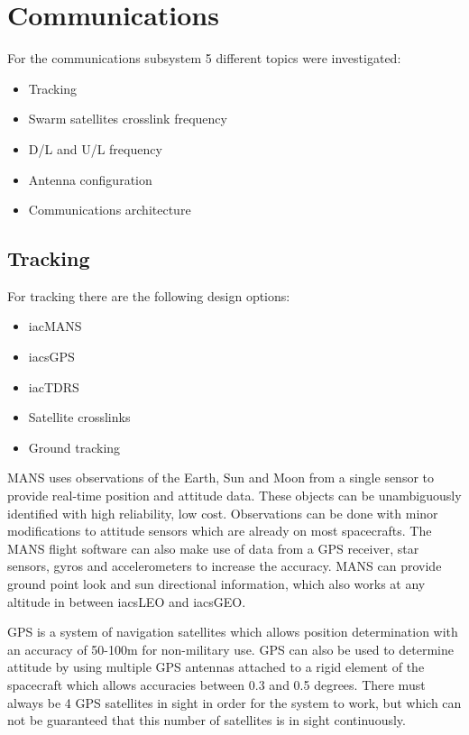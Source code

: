 \section{Communications}
\label{blDOCOM}

For the communications subsystem 5 different topics were investigated:
\begin{itemize}
\item Tracking
\item Swarm satellites crosslink frequency
\item D/L and U/L frequency
\item Antenna configuration
\item Communications architecture
\end{itemize}

\subsection{Tracking}
For tracking there are the following design options:
\begin {itemize}
\item iac{MANS}
\item iacs{GPS}
\item iac{TDRS}
\item Satellite crosslinks
\item Ground tracking
\end {itemize}

MANS uses observations of the Earth, Sun and Moon from a single sensor to provide real-time position and attitude data. These objects can be unambiguously identified with high reliability, low cost. Observations can be done with minor modifications to attitude sensors which are already on most spacecrafts. The MANS flight software can also make use of data from a GPS receiver, star sensors, gyros and accelerometers to increase the accuracy. MANS can provide ground point look and sun directional information, which also works at any altitude in between iacs{LEO} and iacs{GEO}.

GPS is a system of navigation satellites which allows position determination with an accuracy of 50-100m for non-military use. GPS can also be used to determine attitude by using multiple GPS antennas attached to a rigid element of the spacecraft which allows accuracies between 0.3 and 0.5 degrees. There must always be 4 GPS satellites in sight in order for the system to work, but which can not be guaranteed that this number of satellites is in sight continuously.

